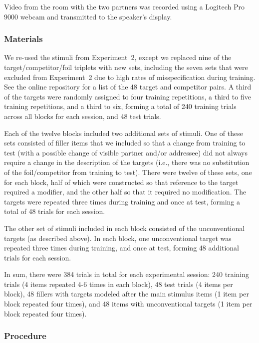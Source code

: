 \documentclass[natbib,doc,a4paper]{apa6}
\begin{document}
Video from the room with the two partners was recorded using a Logitech Pro 9000 webcam and transmitted to the speaker's display.

\subsubsection*{Materials}
\label{sec:org291396d}

We re-used the stimuli from Experiment~2, except we replaced nine of the target/competitor/foil triplets with new sets, including the seven sets that were excluded from Experiment~2 due to high rates of misspecification during training.  See the online repository for a list of the 48 target and competitor pairs.  A third of the targets were randomly assigned to four training repetitions, a third to five training repetitions, and a third to six, forming a total of 240 training trials across all blocks for each session, and 48 test trials.

Each of the twelve blocks included two additional sets of stimuli. One of these sets consisted of filler items that we included so that a change from training to test (with a possible change of visible partner and/or addressee) did not always require a change in the description of the targets (i.e., there was no substitution of the foil/competitor from training to test). There were twelve of these sets, one for each block, half of which were constructed so that reference to the target required a modifier, and the other half so that it required no modification.  The targets were repeated three times during training and once at test, forming a total of 48 trials for each session.

The other set of stimuli included in each block consisted of the unconventional targets (as described above). In each block, one unconventional target was repeated three times during training, and once at test, forming 48 additional trials for each session.

In sum, there were 384 trials in total for each experimental session: 240 training trials (4 items repeated 4-6 times in each block), 48 test trials (4 items per block), 48 fillers with targets modeled after the main stimulus items (1 item per block repeated four times), and 48 items with unconventional targets (1 item per block repeated four times).

\subsubsection*{Procedure}
\label{sec:orgc98dd26}
\end{document}

